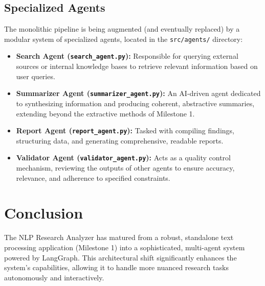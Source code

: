\documentclass[12pt, a4paper]{article}
\begin{document}
\subsection{Specialized Agents}
The monolithic pipeline is being augmented (and eventually replaced) by a modular system of specialized agents, located in the \texttt{src/agents/} directory:
\begin{itemize}
    \item \textbf{Search Agent (\texttt{search\_agent.py}):} Responsible for querying external sources or internal knowledge bases to retrieve relevant information based on user queries.
    \item \textbf{Summarizer Agent (\texttt{summarizer\_agent.py}):} An AI-driven agent dedicated to synthesizing information and producing coherent, abstractive summaries, extending beyond the extractive methods of Milestone 1.
    \item \textbf{Report Agent (\texttt{report\_agent.py}):} Tasked with compiling findings, structuring data, and generating comprehensive, readable reports.
    \item \textbf{Validator Agent (\texttt{validator\_agent.py}):} Acts as a quality control mechanism, reviewing the outputs of other agents to ensure accuracy, relevance, and adherence to specified constraints.
\end{itemize}

\section{Conclusion}
The NLP Research Analyzer has matured from a robust, standalone text processing application (Milestone 1) into a sophisticated, multi-agent system powered by LangGraph. This architectural shift significantly enhances the system's capabilities, allowing it to handle more nuanced research tasks autonomously and interactively.
\end{document}
